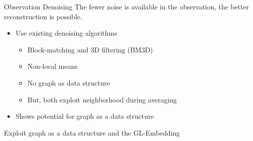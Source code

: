 




\begin{frame}{Observation Denoising}
  The fewer noise is available in the observation, the better reconstruction is possible.
  
  \pause
  \begin{itemize}
    \item Use existing denoising algorithms
    \begin{itemize}
      \item Block-matching and 3D filtering (BM3D) \cite{bm3d}
      \item Non-local means \cite{noneLocalMean}
      \item No graph as data structure
      \item But, both exploit neighborhood during averaging
    \end{itemize}
    \item<3-> \alert<3->{Shows potential for graph as a data structure}
  \end{itemize}

  \begin{tcolorbox}[colback=red!5!white,hide=<1-3>, alert=<4>, colframe=red!75!black]
    Exploit graph as a data structure and the GL-Embedding
\end{tcolorbox}

  
\end{frame}
